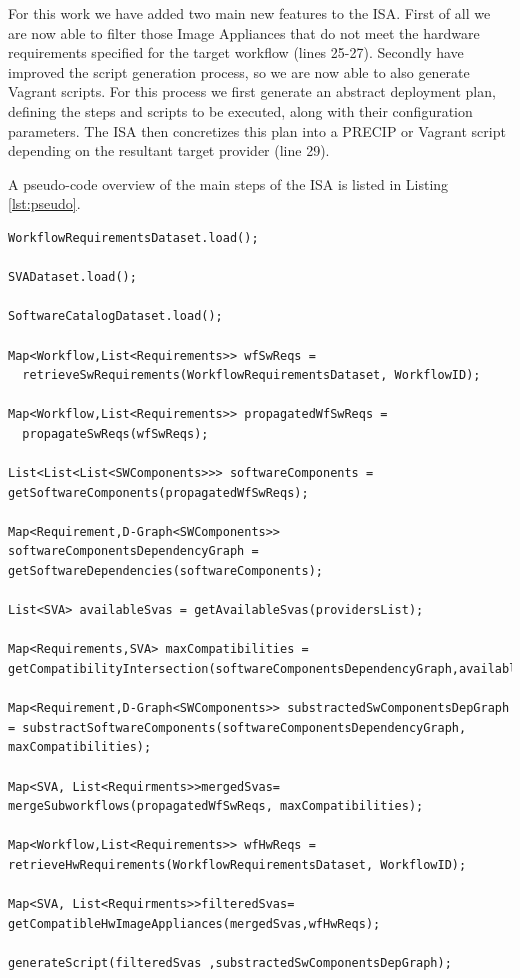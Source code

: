 For this work we have added two main new features to the ISA. First of all we are now able to filter those Image Appliances that do not meet the hardware requirements specified for the target workflow (lines 25-27). Secondly have improved the script generation process, so we are now able to also generate Vagrant scripts. For this process we first generate an abstract deployment plan, defining the steps and scripts to be executed, along with their configuration parameters. The ISA then concretizes this plan into a PRECIP or Vagrant script depending on the resultant target provider (line 29).

A pseudo-code overview of the main steps of the ISA is listed in Listing \ref{lst:pseudo}.

          
\begin{lstlisting}[caption={Pseudo-code overview of the ISA},label={lst:pseudo}]
WorkflowRequirementsDataset.load();

SVADataset.load();

SoftwareCatalogDataset.load();

Map<Workflow,List<Requirements>> wfSwReqs = 
  retrieveSwRequirements(WorkflowRequirementsDataset, WorkflowID);

Map<Workflow,List<Requirements>> propagatedWfSwReqs = 
  propagateSwReqs(wfSwReqs);

List<List<List<SWComponents>>> softwareComponents = getSoftwareComponents(propagatedWfSwReqs);

Map<Requirement,D-Graph<SWComponents>> softwareComponentsDependencyGraph = getSoftwareDependencies(softwareComponents);

List<SVA> availableSvas = getAvailableSvas(providersList);

Map<Requirements,SVA> maxCompatibilities = getCompatibilityIntersection(softwareComponentsDependencyGraph,availableSvas);

Map<Requirement,D-Graph<SWComponents>> substractedSwComponentsDepGraph = substractSoftwareComponents(softwareComponentsDependencyGraph, maxCompatibilities);

Map<SVA, List<Requirments>>mergedSvas= mergeSubworkflows(propagatedWfSwReqs, maxCompatibilities);

Map<Workflow,List<Requirements>> wfHwReqs =   retrieveHwRequirements(WorkflowRequirementsDataset, WorkflowID);

Map<SVA, List<Requirments>>filteredSvas= getCompatibleHwImageAppliances(mergedSvas,wfHwReqs);

generateScript(filteredSvas ,substractedSwComponentsDepGraph);

\end{lstlisting}


